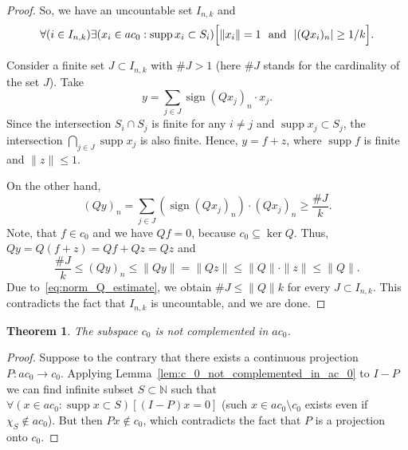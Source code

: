 \documentclass[a4paper,14pt]{article} %
\DeclareMathOperator{\supp}{supp}
\theoremstyle{plain}
\newtheorem{theorem}{Theorem}[section]
\theoremstyle{definition}
\begin{document}
\begin{proof}
	So, we have an uncountable set $I_{n,k}$ and
	\begin{equation}
		\forall(i\in I_{n,k})\exists(x_i \in ac_0 : \supp x_i \subset S_i)\Bigl[\|x_i\|=1 \mbox{~~and~~} |(Qx_i)_n| \geq 1/k\Bigr]
		.
	\end{equation}

	Consider a finite set $J \subset I_{n,k}$ with $\#J>1$
	(here $\#J$ stands for the cardinality of the set $J$).
	Take
	\begin{equation}
		y = \sum_{j \in J} \operatorname{sign}{(Qx_j)_n} \cdot x_j
		.
	\end{equation}
	Since the intersection $S_i \cap S_j$ is finite for any $i \neq j$ and
	$\supp x_j \subset S_j$,
	the intersection $\bigcap\limits_{j\in J} \supp x_j$ is also finite.
	Hence, $y = f + z$,
	where $\supp f$ is finite and $\|z\| \leq 1$.

	On the other hand,
	\begin{equation}
		\label{eq:non_complemented_sum_cardinality}
		(Qy)_n = \sum_{j \in J}
		(\operatorname{sign}(Qx_j)_n)
		\cdot (Qx_j)_n \geq \frac{\# J}{k}
		.
	\end{equation}
	Note, that $f\in c_0$ and we have $Qf = 0$, because $c_0 \subseteq \ker Q$.
	Thus, $Qy = Q(f+z) = Qf + Qz = Qz$ and
	\begin{equation}
		\label{eq:norm_Q_estimate}
		\frac{\# J}{k} \leq (Qy)_n \leq \|Qy\| = \|Qz\| \leq \|Q\| \cdot \|z\| \leq \|Q\|
		.
	\end{equation}
	Due to~\eqref{eq:norm_Q_estimate}, we obtain $\# J \leq \|Q\| k$ for every $J\subset I_{n,k}$.
	This contradicts the fact that $I_{n,k}$ is uncountable,
	and we are done.
\end{proof}

\begin{theorem}
	The subspace $c_0$ is not complemented in $ac_0$.
\end{theorem}

\begin{proof}
	Suppose to the contrary that
	there exists a continuous projection $P: ac_0 \to c_0$.
	Applying Lemma~\ref{lem:c_0_not_complemented_in_ac_0} to $I-P$
	we can find infinite subset $S\subset\mathbb{N}$
	such that $\forall(x\in ac_0 : \supp x \subset S)[(I-P)x = 0]$
	(such $x \in ac_0 \setminus c_0$ exists even if $\chi_S \notin ac_0$).
	But then $Px\notin c_0$,
	which contradicts the fact that $P$ is a projection onto $c_0$.
\end{proof}
\end{document}
